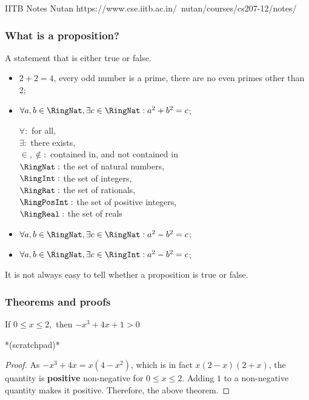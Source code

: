    \begin{frame}[fragile]{IITB Notes Nutan}
https://www.cse.iitb.ac.in/~nutan/courses/cs207-12/notes/
\end{frame}


 \begin{frame}[fragile]\frametitle{What is a proposition?}
A statement that is either true or false.

\begin{itemize}
\item $2+2 = 4$, every odd number is a prime, there are no even primes other than 2;

\item $\forall a,b \in \RingNat, \exists c \in \RingNat: a^2 + b^2 = c$;



$\forall:$ for all, \\
$\exists:$ there exists, \\
$\in, \notin:$ contained in, and not contained in\\

$\RingNat:$ the set of natural numbers,\\
 $\RingInt:$ the set of integers,\\ 
 $\RingRat:$ the set of rationals,\\ 
 $\RingPosInt:$ the set of positive integers,\\
 $\RingReal:$ the set of reals\\
 


\item $\forall a,b \in \RingNat, \exists c \in \RingNat: a^2 - b^2 = c$;


\item $\forall a,b \in \RingNat, \exists c \in \RingInt: a^2 - b^2 = c$;
\end{itemize}

It is not always easy to tell whether a proposition is true or false. 

\end{frame}

 \begin{frame}[fragile]\frametitle{Theorems and proofs}
\begin{theorem}
If $0 \leq x \leq 2,$ then $-x^3+4x+1 > 0$
\end{theorem}

*(scratchpad)*

\begin{proof}
As $-x^3+4x = x(4-x^2)$, which is in fact $x(2-x)(2+x)$, the quantity is 
\textbf{positive} 
non-negative for $0\leq x \leq 2$.
Adding $1$ to a non-negative quantity makes it positive. Therefore, the above theorem.
\end{proof}
\end{frame}

